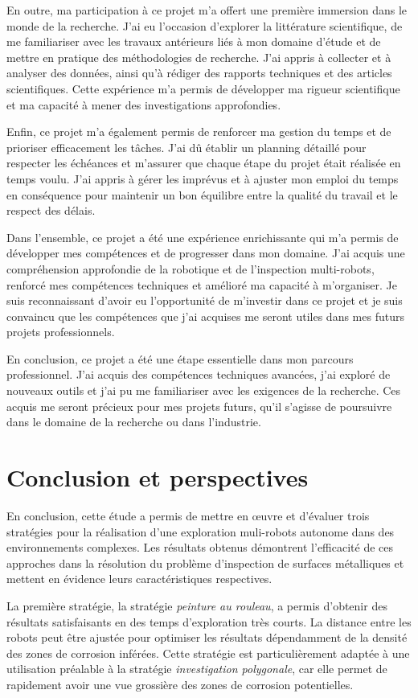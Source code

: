 \documentclass[francais,RandD]{rapportPFE}
\begin{document}
		En outre, ma participation à ce projet m'a offert une première immersion dans le monde de la recherche.
		J'ai eu l'occasion d'explorer la littérature scientifique, de me familiariser avec les travaux antérieurs liés à mon domaine d'étude et de mettre en pratique des méthodologies de recherche.
		J'ai appris à collecter et à analyser des données, ainsi qu'à rédiger des rapports techniques et des articles scientifiques.
		Cette expérience m'a permis de développer ma rigueur scientifique et ma capacité à mener des investigations approfondies.

		Enfin, ce projet m'a également permis de renforcer ma gestion du temps et de prioriser efficacement les tâches.
		J'ai dû établir un planning détaillé pour respecter les échéances et m'assurer que chaque étape du projet était réalisée en temps voulu.
		J'ai appris à gérer les imprévus et à ajuster mon emploi du temps en conséquence pour maintenir un bon équilibre entre la qualité du travail et le respect des délais.

		Dans l'ensemble, ce projet a été une expérience enrichissante qui m'a permis de développer mes compétences et de progresser dans mon domaine.
		J'ai acquis une compréhension approfondie de la robotique et de l'inspection multi-robots, renforcé mes compétences techniques et amélioré ma capacité à m'organiser.
		Je suis reconnaissant d'avoir eu l'opportunité de m'investir dans ce projet et je suis convaincu que les compétences que j'ai acquises me seront utiles dans mes futurs projets professionnels.

		En conclusion, ce projet a été une étape essentielle dans mon parcours professionnel.
		J'ai acquis des compétences techniques avancées, j'ai exploré de nouveaux outils et j'ai pu me familiariser avec les exigences de la recherche.
		Ces acquis me seront précieux pour mes projets futurs, qu'il s'agisse de poursuivre dans le domaine de la recherche ou dans l'industrie.
	\section{Conclusion et perspectives}
		En conclusion, cette étude a permis de mettre en œuvre et d'évaluer trois stratégies pour la réalisation d'une exploration muli-robots autonome dans des environnements complexes.
		Les résultats obtenus démontrent l'efficacité de ces approches dans la résolution du problème d'inspection de surfaces métalliques et mettent en évidence leurs caractéristiques respectives.

		La première stratégie, la stratégie \textit{peinture au rouleau}, a permis d'obtenir des résultats satisfaisants en des temps d'exploration très courts.
		La distance entre les robots peut être ajustée pour optimiser les résultats dépendamment de la densité des zones de corrosion inférées.
		Cette stratégie est particulièrement adaptée à une utilisation préalable à la stratégie \textit{investigation polygonale}, car elle permet de rapidement avoir une vue grossière des zones de corrosion potentielles.
\end{document}
